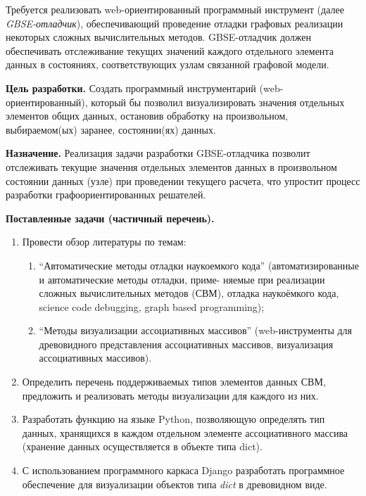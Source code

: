 \def\notedate{2021.12.19}
\def\currentauthor{Крехтунова Д.Д. (РК6-73Б), Соколов А.П. (РК6)}

Требуется реализовать web-ориентированный программный инструмент (далее \textit{GBSE-отладчик}), обеспечивающий проведение отладки графовых реализации некоторых сложных вычислительных методов. GBSE-отладчик должен обеспечивать отслеживание текущих значений каждого отдельного элемента данных в состояниях, соответствующих узлам связанной графовой модели.

\textbf{Цель разработки.} Создать программный инструментарий (web-ориентированный), который бы позволил визуализировать значения отдельных элементов общих данных\cite{SokPersh2018GBSE}, остановив обработку на произвольном, выбираемом(ых) заранее, состоянии(ях) данных.  

\textbf{Назначение.} Реализация задачи разработки GBSE-отладчика позволит отслеживать текущие значения отдельных элементов данных в произвольном состоянии данных (узле) при проведении текущего расчета, что упростит процесс разработки графоориентированных решателей. 


\textbf{Поставленные задачи (частичный перечень).}
\begin{enumerate}
	\item Провести обзор литературы по темам:
	\begin{enumerate}
		\item ``Автоматические методы отладки наукоемкого кода'' (автоматизированные и автоматические методы отладки, приме- няемые при реализации сложных вычислительных методов (СВМ), отладка наукоёмкого кода, science code debugging, graph based programming);
		\item ``Методы визуализации ассоциативных массивов'' (web-инструменты для древовидного представления ассоциативных массивов, визуализация ассоциативных массивов).
	\end{enumerate}
	\item Определить перечень поддерживаемых типов элементов данных СВМ, предложить и реализовать методы визуализации для каждого из них.
	\item Разработать функцию на языке \textsf{Python}, позволяющую определять тип данных, хранящихся в каждом отдельном элементе ассоциативного массива (хранение данных осуществляется в объекте типа \textsf{dict}). 
	\item С использованием программного каркаса Django разработать программное обеспечение для визуализации объектов типа \textit{dict} в древовидном виде.
\end{enumerate}


\noteattributes{}

